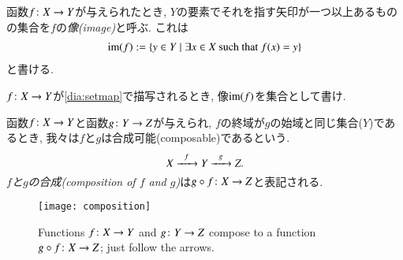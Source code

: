 
函数$f\colon X\rightarrow Y$が与えられたとき, $Y$の要素でそれを指す矢印が一つ以上あるものの集合を$f$の\emph{像(image)}と呼ぶ. これは
\begin{align}\label{dia:image}
\im(f):=\{y\in Y\| \exists x\in X \tn{ such that } f(x)=y\}
\end{align}
と書ける.

\begin{exercise}
$f\colon X\rightarrow Y$が\eqref{dia:setmap}で描写されるとき, 像$\im(f)$を集合として書け.
\end{exercise}


函数$f\colon X\rightarrow Y$と函数$g\colon Y\rightarrow Z$が与えられ, $f$の終域が$g$の始域と同じ集合($Y$)であるとき, 我々は$f$と$g$は合成可能(composable)であるという.
$$X\xrightarrow{\ \ f\ \ }Y\xrightarrow{\ \ g\ \ }Z.$$ \emph{$f$と$g$の合成(composition of $f$ and $g$)}\label{function composition}は$g\circ f\colon X\rightarrow Z$と表記される. 

\begin{figure}[h]
\begin{center}
\texttt{[image: composition]}
\end{center}
\caption{Functions $f\colon X\rightarrow Y$ and $g\colon Y\rightarrow Z$ compose to a function $g\circ f\colon X\rightarrow Z$; just follow the arrows.}
\end{figure}


